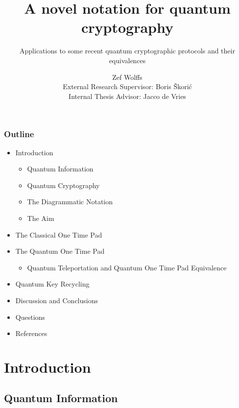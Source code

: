\documentclass[]{beamer}
\title{A novel notation for quantum cryptography}
\subtitle{Applications to some recent quantum cryptographic protocols and their equivalences}
\author{Zef Wolffs \\ External Research Supervisor: Boris Škorić \\ Internal Thesis Advisor: Jacco de Vries }
\begin{document}
\maketitle

\begin{frame}
\frametitle{Outline}

\begin{itemize}

\item Introduction
	\begin{itemize}
		\item Quantum Information
		\item Quantum Cryptography
		\item The Diagrammatic Notation
		\item The Aim
	\end{itemize}

\item The Classical One Time Pad

\item The Quantum One Time Pad
	\begin{itemize}
		\item Quantum Teleportation and Quantum One Time Pad Equivalence
	\end{itemize}

\item Quantum Key Recycling

\item Discussion and Conclusions

\item Questions

\item References

\end{itemize}
\end{frame}

\section{Introduction}

\begin{frame}
	\centering 
	\Huge
\end{frame}

\subsection{Quantum Information}
\end{document}
